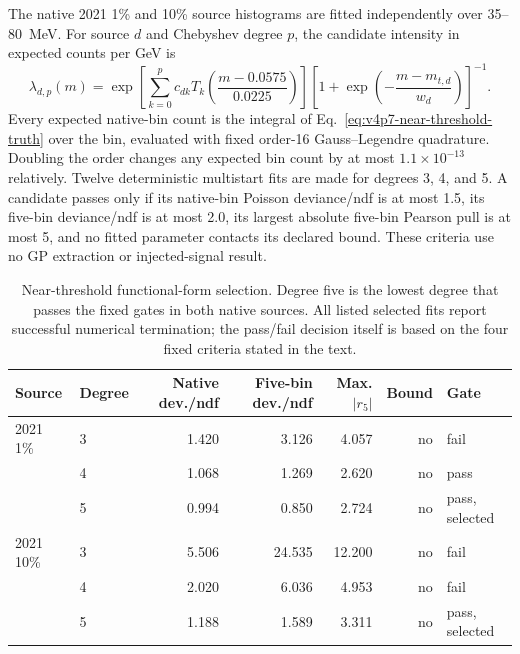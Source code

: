 The native 2021 1\% and 10\% source histograms are fitted independently over
35--80~MeV.  For source $d$ and Chebyshev degree $p$, the candidate intensity
in expected counts per GeV is
\begin{equation}
 \lambda_{d,p}(m)=
 \exp\!\left[\sum_{k=0}^{p}c_{dk}T_k\!\left(
 \frac{m-0.0575}{0.0225}\right)\right]
 \left[1+\exp\!\left(-\frac{m-m_{t,d}}{w_d}\right)\right]^{-1} .
 \label{eq:v4p7-near-threshold-truth}
\end{equation}
Every expected native-bin count is the integral of
Eq.~\eqref{eq:v4p7-near-threshold-truth} over the bin, evaluated with fixed
order-16 Gauss--Legendre quadrature.  Doubling the order changes any expected
bin count by at most $1.1\times10^{-13}$ relatively.  Twelve deterministic
multistart fits are made for degrees 3, 4, and 5.  A candidate passes only if
its native-bin Poisson deviance/ndf is at most 1.5, its five-bin
deviance/ndf is at most 2.0, its largest absolute five-bin Pearson pull is at
most 5, and no fitted parameter contacts its declared bound.  These criteria
use no GP extraction or injected-signal result.

\begin{table}[htbp]
\centering
\caption{Near-threshold functional-form selection.  Degree five is the lowest
degree that passes the fixed gates in both native sources.  All listed selected
fits report successful numerical termination; the pass/fail decision itself is
based on the four fixed criteria stated in the text.}
\label{tab:v4p7-near-threshold-model-selection}
\small
\begin{tabular}{llrrrrl}
\toprule
Source & Degree & Native dev./ndf & Five-bin dev./ndf & Max. $|r_5|$ & Bound & Gate \\
\midrule
2021 1\%  & 3 & 1.420 & 3.126 & 4.057 & no & fail \\
          & 4 & 1.068 & 1.269 & 2.620 & no & pass \\
          & 5 & 0.994 & 0.850 & 2.724 & no & pass, selected \\
2021 10\% & 3 & 5.506 & 24.535 & 12.200 & no & fail \\
          & 4 & 2.020 & 6.036 & 4.953 & no & fail \\
          & 5 & 1.188 & 1.589 & 3.311 & no & pass, selected \\
\bottomrule
\end{tabular}
\end{table}

